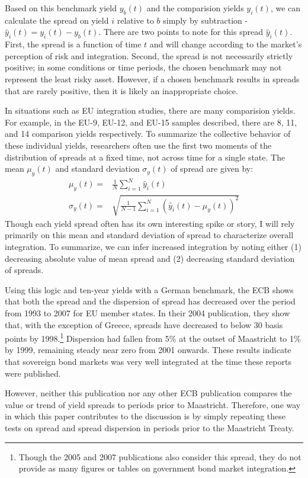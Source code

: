\documentclass[3p]{elsarticle}
\begin{document}
Based on this benchmark yield $y_b(t)$ and the comparision yields $y_i(t)$, we can calculate the spread on yield $i$ relative to $b$ simply by subtraction - $\hat{y}_i(t) = y_i(t) - y_b(t)$.  There are two points to note for this spread $\hat{y}_i(t)$.  First, the spread is a function of time $t$ and will change according to the market's perception of risk and integration.  Second, the spread is not necessarily strictly positive; in some conditions or time periods, the chosen benchmark may not represent the least risky asset.  However, if a chosen benchmark results in spreads that are rarely positive, then it is likely an inappropriate choice.

In situations such as EU integration studies, there are many comparision yields.  For example, in the EU-9, EU-12, and EU-15 samples described, there are 8, 11, and 14 comparison yields respectively.  To summarize the collective behavior of these individual yields, researchers often use the first two moments of the distribution of spreads at a fixed time, not across time for a single state.  The mean $\mu_y(t)$ and standard deviation $\sigma_y(t)$ of spread are given by:
\begin{align*}
	\mu_y(t) =& \frac{1}{N} \sum_{i=1}^N \hat{y}_i(t)\\
	\sigma_y(t) =& \sqrt{\frac{1}{N-1} \sum_{i=1}^N (\hat{y}_i(t) - \mu_y(t))^2}
\end{align*}
Though each yield spread often has its own interesting spike or story, I will rely primarily on this mean and standard deviation of spread to characterize overall integration.  To summarize, we can infer increased integration by noting either (1) decreasing absolute value of mean spread and (2) decreasing standard deviation of spreads.

Using this logic and ten-year yields with a German benchmark, the ECB shows that both the spread and the dispersion of spread has decreased over the period from 1993 to 2007 for EU member states.  In their 2004 publication, they show that, with the exception of Greece, spreads have decreased to below 30 basis points by 1998.\footnote{Though the 2005 and 2007 publications also consider this spread, they do not provide as many figures or tables on government bond market integration.}  Dispersion had fallen from 5\% at the outset of Maastricht to 1\% by 1999, remaining steady near zero from 2001 onwards.  These results indicate that sovereign bond markets was very well integrated at the time these reports were published.

However, neither this publication nor any other ECB publication compares the value or trend of yield spreads to periods prior to Maastricht.  Therefore, one way in which this paper contributes to the discussion is by simply repeating these tests on spread and spread dispersion in periods prior to the Maastricht Treaty.
\end{document}
